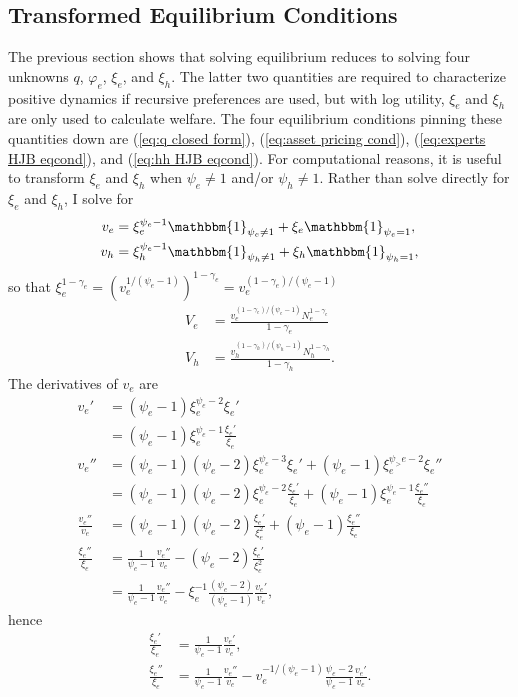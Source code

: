 \documentclass[12 pt, oneside]{article}
\theoremstyle{definition}
\theoremstyle{definition}
\theoremstyle{definition}
\newcommand{\RA}{\Rightarrow}
\begin{document}
\subsection{Transformed Equilibrium Conditions}
The previous section shows that solving equilibrium reduces to solving four unknowns  $q$, $\varphi_e$, $\xi_e$, and $\xi_h$. The latter two quantities are required to characterize positive dynamics if recursive preferences are used, but with log utility, $\xi_e$ and $\xi_h$ are only used to calculate welfare.  The four equilibrium conditions pinning these quantities down are (\ref{eq:q closed form}), (\ref{eq:asset pricing cond}), (\ref{eq:experts HJB eqcond}), and (\ref{eq:hh HJB eqcond}). For computational reasons, it is useful to transform $\xi_e$ and $\xi_h$ when $\psi_e \neq 1$ and/or $\psi_h\neq 1$. Rather than solve directly for $\xi_e$ and $\xi_h$, I solve for
\begin{align}
\label{eq:ve transform}
  v_e &  = \xi_e^{\psi_e - 1}\mathbbm{1}_{\psi_e \neq 1} + \xi_e\mathbbm{1}_{\psi_e = 1},\\
\label{eq:vh transform}
  v_h & = \xi_h^{\psi_e - 1}\mathbbm{1}_{\psi_h \neq 1} + \xi_h\mathbbm{1}_{\psi_h = 1},
\end{align}
so that $\xi_e^{1 - \gamma_e} = (v_e^{1 / (\psi_e - 1)} )^{1 - \gamma_e} = v_e^{(1 - \gamma_e) / ( \psi_e - 1)}$
\begin{align}\label{eq:value function Ve transform}
  V_e & = \frac{v_e^{(1- \gamma_e) / (\psi_e - 1)} N_e^{1  - \gamma_e}}{1 - \gamma_e}\\
  V_h & = \frac{v_h^{(1- \gamma_h) / (\psi_h - 1)} N_h^{1  - \gamma_h}}{1 - \gamma_h}.
\end{align}
The derivatives of $v_e$ are
\begin{align*}
  v_e' & = (\psi_e - 1)\xi_e^{\psi_e - 2}\xi_e'\\
       & = (\psi_e - 1)\xi_e^{\psi_e - 1}\frac{\xi_e'}{\xi_e}\\
  v_e'' & =(\psi_e - 1)(\psi_e - 2)\xi_e^{\psi_e - 3}\xi_e' + (\psi_e - 1)\xi_e^{\psi_>e - 2}\xi_e''\\
       & = (\psi_e - 1)(\psi_e - 2)\xi_e^{\psi_e - 2}\frac{\xi_e'}{\xi_e} + (\psi_e - 1)\xi_e^{\psi_e - 1}\frac{\xi_e''}{\xi_e}\\
\frac{v_e''}{v_e} & = (\psi_e - 1)(\psi_e - 2)\frac{\xi_e'}{\xi_e^2} + (\psi_e - 1)\frac{\xi_e''}{\xi_e}\\
  \frac{\xi_e''}{\xi_e} & = \frac{1}{\psi_e - 1}\frac{v_e''}{v_e} - (\psi_e - 2)\frac{\xi_e'}{\xi_e^2}\\
       & =  \frac{1}{\psi_e - 1}\frac{v_e''}{v_e} - \xi_e^{-1} \frac{(\psi_e - 2)}{(\psi_e - 1)}\frac{v_e'}{v_e},
\end{align*}
hence %
\begin{align}\label{eq:xie derivative as function of ve}
  \frac{\xi_e'}{\xi_e} & = \frac{1}{\psi_e - 1}\frac{v_e'}{v_e},\\
\frac{\xi_e''}{\xi_e}  & =  \frac{1}{\psi_e - 1}\frac{v_e''}{v_e} - v_e^{-1 / (\psi_e - 1)} \frac{\psi_e - 2}{\psi_e - 1}\frac{v_e'}{v_e}.
\end{align}
\end{document}
